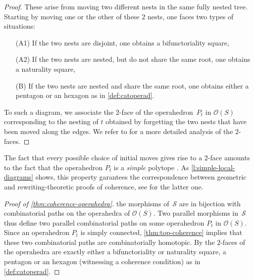 {\begin{proof}
These arise from moving two different nests in the same fully nested tree. 
Starting by moving one or the other of these $2$ nests, one faces two types of situations:
\begin{itemize}
    \item[(A1)] If the two nests are disjoint, one obtains a bifunctoriality square,
    \item[(A2)] If the two nests are nested, but do not share the same root, one obtains a naturality square,
    \item[(B)] If the two nests are nested and share the same root, one obtains either a pentagon or an hexagon as in \cref{def:catoperad}.
\end{itemize}
To such a diagram, we associate the $2$-face of the operahedron~$P_t$ in $\mathcal{O}(S)$ corresponding to the nesting of $t$ obtained by forgetting the two nests that have been moved along the edges.
We refer to \cite[Sec.~2]{CLA24} for a more detailed analysis of the $2$-faces.  
\end{proof}
\begin{rem}
    The fact that every possible choice of initial moves gives rise to a $2$-face amounts to the fact that the operahedron $P_t$ is a \emph{simple} polytope \cite[Sec.~9]{DP-HP}.
    As \cref{l:simple-local-diagrams} shows, this property garantees the correspondence between geometric and rewriting-theoretic proofs of coherence, see \cite{CLA24} for the latter one.
\end{rem}}

\begin{proof}[Proof of {\cref{thm:coherence-operahedra}}]
     the morphisms of~$\mathcal{S}$ are in bijection with combinatorial paths on the operahedra of $\mathcal{O}(S)$.
Two parallel morphisms in~$\mathcal{S}$ thus define two parallel combinatorial paths on some operahedron $P_t$ in $\mathcal{O}(S)$. 
Since an operahedron $P_t$ is simply connected, \cref{thm:top-coherence} implies that these two combinatorial paths are combinatorially homotopic. 
By  the $2$-faces of the operahedra are exactly either a bifunctoriality or naturality square, a pentagon or an hexagon (witnessing a coherence condition) as in \cref{def:catoperad}.
\end{proof}

